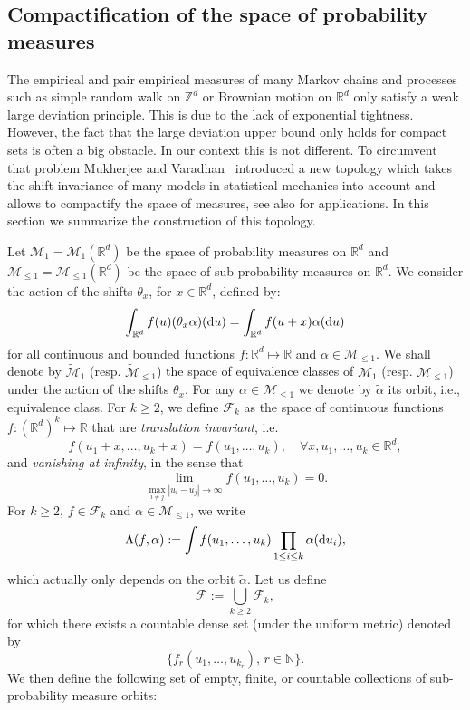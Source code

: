 \documentclass[a4paper,11pt]{amsart}
\numberwithin{equation}{section}
\newcommand{\bbN}{{\ensuremath{\mathbb N}} }
\newcommand{\bbR}{{\ensuremath{\mathbb R}} }
\newcommand{\bbZ}{{\ensuremath{\mathbb Z}} }
\newcommand{\cF}{{\ensuremath{\mathcal F}} }
\newcommand{\cM}{{\ensuremath{\mathcal M}} }
\newcommand{\ga}{\alpha}
\newcommand{\gt}{\theta}
\newcommand{\gL}{\Lambda}
\renewcommand{\tilde}{\widetilde}          %
\newcommand{\dd}{\text{\rm d}}             %
\newcommand{\8}{\infty}
\newcommand{\beq}{\begin{equation}}
\newcommand{\eeq}{\end{equation}}
\begin{document}
\subsection{Compactification of the space of probability measures}
\label{sec:compact-topo0}
The empirical and pair empirical measures of many Markov chains and processes such as simple random walk on $\bbZ^d$ or Brownian motion on $\bbR^d$ only satisfy a weak large deviation principle. This is due to the lack of exponential tightness. However, the fact that the large deviation upper bound only holds for compact sets is often a big obstacle. In our context this is not different. To circumvent that problem Mukherjee and Varadhan~\cite{MV2016} introduced a new topology which takes the shift invariance of many models in statistical mechanics into account and allows to compactify the space of measures, see also \cite{BatCha20,BroMuk19,KM2017,BKM2017} for applications. In this section we summarize the construction of this topology.
%
\par Let $\cM_1= \cM_1(\bbR^d)$ be the space of probability measures on $\bbR^d$ and $\cM_{\le1} = \cM_{\le1}(\bbR^d)$ be the space of sub-probability measures on $\bbR^d$. We consider the action of the shifts $\gt_x$, for $x\in\bbR^d$, defined by:
\beq
\int_{\bbR^d} f(u) (\gt_x \ga)(\dd u) = \int_{\bbR^d} f(u+x)  \ga(\dd u)
\eeq
for all continuous and bounded functions $f\colon \bbR^d\mapsto \bbR$ and $\ga\in \cM_{\le1}$. We shall denote by $\tilde \cM_1$ (resp. $\tilde \cM_{\le 1}$) the space of equivalence classes of $\cM_1$ (resp. $\cM_{\le 1}$) under the action of the shifts $\gt_x$. For any $\alpha\in \cM_{\le 1}$ we denote by $\tilde\alpha$ its orbit, i.e., equivalence class. For $k\ge 2$, we define $\cF_k$ as the space of continuous functions $f\colon (\bbR^d)^k \mapsto \bbR$ that are {\it translation invariant}, i.e.
\beq
f(u_1+x, \ldots, u_k +x) = f(u_1,\ldots, u_k), \quad \forall x,u_1,\ldots, u_k \in \bbR^d,
\eeq
and {\it vanishing at infinity}, in the sense that
\beq
\lim_{\max_{i\neq j} |u_i-u_j|\to \infty} f(u_1, \ldots, u_k) = 0.
\eeq
For $k\ge 2$, $f\in \cF_k$ and $\ga \in \cM_{\le 1}$, we write
\beq
\label{eq:defLambda0}
\gL(f, \ga) := \int f(u_1,\ldots, u_{k}) \prod_{1\le i\le k} \ga(\dd u_i),
\eeq
which actually only depends on the orbit $\tilde \ga$. 
Let us define
\beq
\cF := \bigcup_{k\ge 2} \cF_k,
\eeq
for which there exists a countable dense set (under the uniform metric) denoted by
\beq
\{f_r(u_1,\ldots, u_{k_r}),\, r\in \bbN\}.
\eeq
We then define the following set of empty, finite, or countable collections of sub-probability measure orbits:
\end{document}
